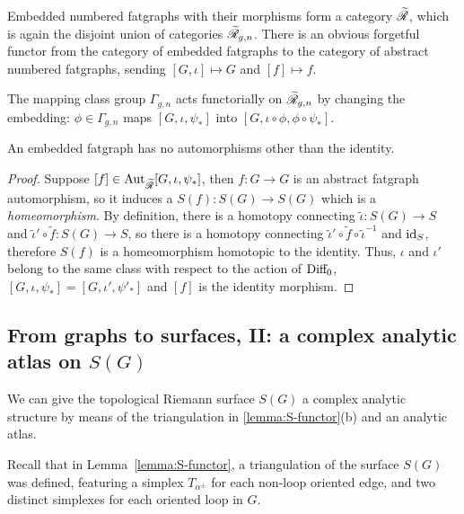 Embedded numbered fatgraphs with their morphisms form a category
$\mathscr{\widetilde R}$, which is again the disjoint union of categories $\mathscr{\widetilde R}_{g,n}$.
There is an obvious forgetful functor from the category of embedded
fatgraphs to the category of abstract numbered fatgraphs,
sending $[G, \iota] \mapsto G$ and $[f] \mapsto f$.

The mapping class group $\Gamma_{g,n}$ acts functorially on
$\mathscr{\widetilde R}_{g,n}$ by changing the embedding: $\phi \in \Gamma_{g,n}$ maps
$[G, \iota, \psi_*]$ into $[G, \iota \circ \phi, \phi \circ \psi_*]$.

\begin{lemma}
  \label{lemma:erg-no-aut}
  An embedded fatgraph has no automorphisms other than the identity.
\end{lemma}
\begin{proof}
  Suppose $[f] \in \operatorname{Aut}_{\mathscr{\widetilde R}}[G, \iota, \psi_*]$, then $f:G\to G$ is an abstract
  fatgraph automorphism, so it induces a $S(f): S(G) \to S(G)$
  which is a \emph{homeomorphism}.  By definition, there is a homotopy
  connecting ${\tilde \iota}: S(G) \to S$ and ${\tilde \iota'} \circ {\tilde f}:
  S(G)\to S$, so there is a homotopy connecting ${\tilde \iota'} \circ {\tilde f}
  \circ {\tilde \iota}^{-1}$ and $\operatorname{id}_S$, therefore $S(f)$ is a
  homeomorphism homotopic to the identity.  Thus, $\iota$ and $\iota'$ belong
  to the same class with respect to the action of $\textrm{Diff}_0$, $[G, \iota,
  \psi_*] = [G, \iota', \psi'_*]$ and $[f]$ is the identity morphism.
\end{proof}


\subsection{From graphs to surfaces, II: a complex analytic atlas on $S(G)$}
\label{sec:atlas}

We can give the topological Riemann surface $S(G)$ a complex analytic
structure by means of the triangulation in \ref{lemma:S-functor}(b)
and an analytic atlas.

Recall that in Lemma~\ref{lemma:S-functor}, a triangulation of the surface
$S(G)$ was defined, featuring a simplex $T_{\alpha^\pm}$ for each
non-loop oriented edge, and two distinct simplexes for each oriented
loop in $G$.

